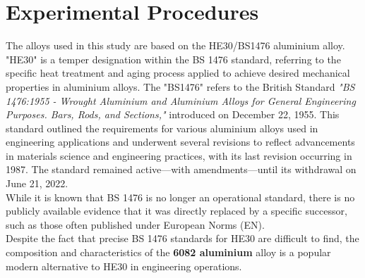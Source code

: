 \documentclass{article}
\begin{document}
\section{Experimental Procedures}
The alloys used in this study are based on the HE30/BS1476 aluminium alloy. "HE30" is a temper designation within the BS 1476 standard, referring to the specific heat treatment and aging process applied to achieve desired mechanical properties in aluminium alloys. The "BS1476" refers to the British Standard \textit{"BS 1476:1955 - Wrought Aluminium and Aluminium Alloys for General Engineering Purposes. Bars, Rods, and Sections,"} introduced on December 22, 1955. This standard outlined the requirements for various aluminium alloys used in engineering applications and underwent several revisions to reflect advancements in materials science and engineering practices, with its last revision occurring in 1987. The standard remained active—with amendments—until its withdrawal on June 21, 2022.\\[8pt]
While it is known that BS 1476 is no longer an operational standard, there is no publicly available evidence that it was directly replaced by a specific successor, such as those often published under European Norms (EN).\\[8pt] 
Despite the fact that precise BS 1476 standards for HE30 are difficult to find, the composition and characteristics of the \textbf{6082 aluminium} alloy is a popular modern alternative to HE30 in engineering operations.
\end{document}

